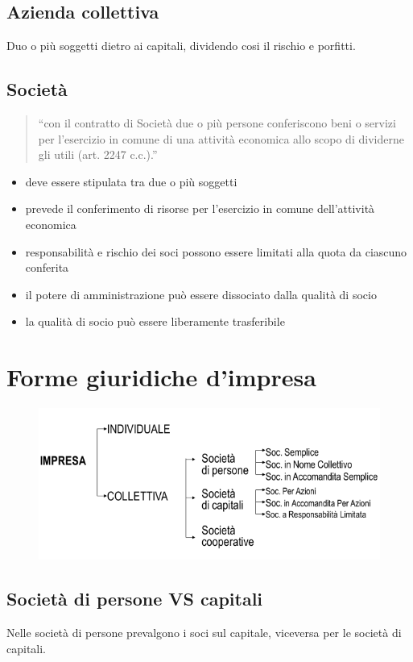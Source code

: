 \subsection{Azienda collettiva}
Duo o più soggetti dietro ai capitali, dividendo cosi il rischio 
e porfitti.

\subsection{Società}
\begin{quotation}
    ``con il contratto di Società due o più persone conferiscono beni
    o servizi per l’esercizio in comune di una attività economica
    allo scopo di dividerne gli utili (art. 2247 c.c.).''
\end{quotation}

\begin{itemize}
    \item deve essere stipulata tra due o più soggetti
    \item prevede il conferimento di risorse per l'esercizio in comune dell'attività economica
    \item responsabilità e rischio dei soci possono essere limitati alla quota da ciascuno conferita
    \item il potere di amministrazione può essere dissociato dalla qualità di socio
    \item la qualità di socio può essere liberamente trasferibile
\end{itemize}

\section{Forme giuridiche d'impresa}
\begin{figure}[h!]
    \centering
    \includegraphics[width=0.6\linewidth]{img/2022-03-27-19-09-18.png}
\end{figure}

\subsection{Società di persone VS capitali}
Nelle società di persone prevalgono i soci sul capitale, viceversa per le società di capitali.

